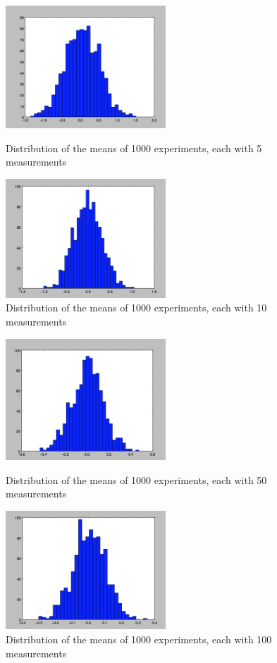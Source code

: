 \documentclass[12pt]{article}
\begin{document}
\begin{figure}[ht]
	\centering
	\begin{minipage}[b]{0.47\linewidth}
		\includegraphics[width = 6cm]{P3N=5.png}
		\caption{Distribution of the means of 1000 experiments, each with 5 measurements}
		\label{fig:minipage1}
	\end{minipage}
	\quad
	\begin{minipage}[b]{0.47\linewidth}
		\includegraphics[width = 6cm]{P3N=10.png}
		\caption{Distribution of the means of 1000 experiments, each with 10 measurements}
		\label{fig:minipage2}
	\end{minipage}
\end{figure}

\begin{figure}[ht]
	\centering
	\begin{minipage}[b]{0.47\linewidth}
		\includegraphics[width = 6cm]{P3N=50.png}
		\caption{Distribution of the means of 1000 experiments, each with 50 measurements}
		\label{fig:minipage1}
	\end{minipage}
	\quad
	\begin{minipage}[b]{0.47\linewidth}
		\includegraphics[width = 6cm]{P3N=100.png}
		\caption{Distribution of the means of 1000 experiments, each with 100 measurements}
		\label{fig:minipage2}
	\end{minipage}
\end{figure}
\end{document}
